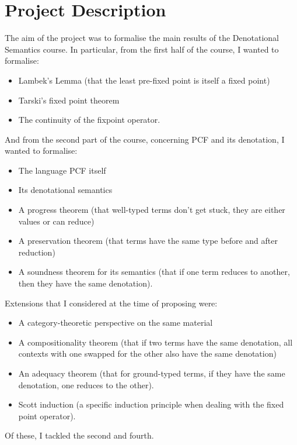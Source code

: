 \documentclass[12pt,a4paper,twoside,openright]{report}
\begin{document}
\section{Project Description}
The aim of the project was to formalise the main results of the Denotational Semantics course. In particular, from the first half of the course, I wanted to formalise:
\begin{itemize}
\item Lambek's Lemma (that the least pre-fixed point is itself a fixed point)
\item Tarski's fixed point theorem
\item The continuity of the fixpoint operator.
\end{itemize}
And from the second part of the course, concerning PCF and its denotation, I wanted to formalise:
\begin{itemize}
\item The language PCF itself
\item Its denotational semantics
\item A progress theorem (that well-typed terms don't get stuck, they are either values or can reduce)
\item A preservation theorem (that terms have the same type before and after reduction)
\item A soundness theorem for its semantics (that if one term reduces to another, then they have the same denotation).
\end{itemize}
Extensions that I considered at the time of proposing were:
\begin{itemize}
\item A category-theoretic perspective on the same material
\item A compositionality theorem (that if two terms have the same denotation, all contexts with one swapped for the other also have the same denotation)
\item An adequacy theorem (that for ground-typed terms, if they have the same denotation, one reduces to the other). 
\item Scott induction (a specific induction principle when dealing with the fixed point operator). 
\end{itemize}
Of these, I tackled the second and fourth.
\end{document}
